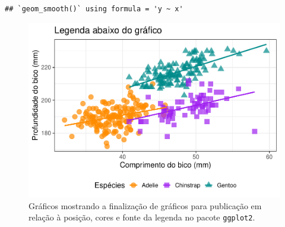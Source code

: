 \documentclass[
]{article}
\begin{document}
\begin{verbatim}
## `geom_smooth()` using formula = 'y ~ x'
\end{verbatim}

\begin{figure}
\centering
\includegraphics{epr_files/figure-latex/fig-plot-final-legenda-2.pdf}
\caption{\label{fig:fig-plot-final-legenda-2}Gráficos mostrando a finalização de gráficos para publicação em relação à posição, cores e fonte da legenda no pacote \texttt{ggplot2}.}
\end{figure}
\end{document}
